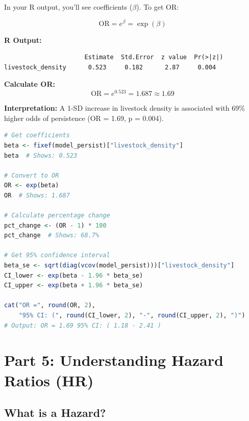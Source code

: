 \documentclass[11pt,a4paper]{article}
\begin{document}
In your R output, you'll see coefficients ($\beta$). To get OR:

\begin{equation}
\boxed{\text{OR} = e^{\beta} = \exp(\beta)}
\end{equation}

\begin{example}
\textbf{R Output:}
\begin{verbatim}
                      Estimate  Std.Error  z value  Pr(>|z|)
livestock_density      0.523     0.182      2.87     0.004
\end{verbatim}

\textbf{Calculate OR:}
\[
\text{OR} = e^{0.523} = 1.687 \approx 1.69
\]

\textbf{Interpretation:} A 1-SD increase in livestock density is associated with 69\% higher odds of persistence (OR = 1.69, p = 0.004).
\end{example}

\begin{rcode}
\begin{lstlisting}[language=R]
# Get coefficients
beta <- fixef(model_persist)["livestock_density"]
beta  # Shows: 0.523

# Convert to OR
OR <- exp(beta)
OR  # Shows: 1.687

# Calculate percentage change
pct_change <- (OR - 1) * 100
pct_change  # Shows: 68.7%

# Get 95% confidence interval
beta_se <- sqrt(diag(vcov(model_persist)))["livestock_density"]
CI_lower <- exp(beta - 1.96 * beta_se)
CI_upper <- exp(beta + 1.96 * beta_se)

cat("OR =", round(OR, 2), 
    "95% CI: (", round(CI_lower, 2), "-", round(CI_upper, 2), ")")
# Output: OR = 1.69 95% CI: ( 1.18 - 2.41 )
\end{lstlisting}
\end{rcode}

\section{Part 5: Understanding Hazard Ratios (HR)}

\subsection{What is a Hazard?}
\end{document}

